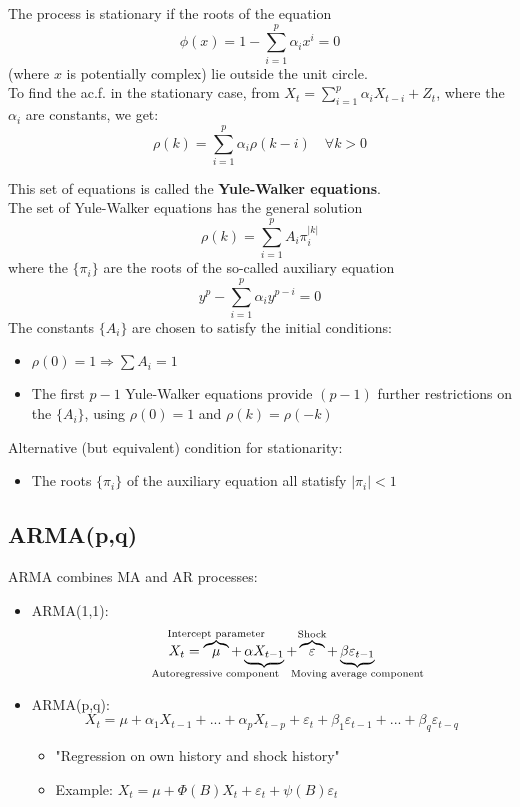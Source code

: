 The process is stationary if the roots of the equation \[
\phi(x)=1-\sum_{i=1}^p \alpha_i x^{i} = 0
\] (where $x$ is potentially complex) lie outside the unit circle.\\

To find the ac.f. in the stationary case, from $X_t=\sum_{i=1}^p \alpha_i X_{t-i}+Z_t$, where the $\alpha_i$ are constants, we get:\[\rho(k)=\sum_{i=1}^p \alpha_i\rho(k-i) \quad \forall k>0\]

This set of equations is called the \textbf{Yule-Walker equations}.\\

The set of Yule-Walker equations has the general solution \[
\rho(k) = \sum_{i=1}^p A_i\pi_i^{|k|}
\]
where the $\{\pi_i\}$ are the roots of the so-called auxiliary equation \[
y^p - \sum_{i=1}^p \alpha_i y^{p-i}=0
\]
The constants $\{A_i\}$ are chosen to satisfy the initial conditions:
\begin{itemize}
    \item $\rho(0)=1 \Rightarrow \sum A_i = 1 $
    \item The first ${p-1}$ Yule-Walker equations provide $(p-1)$ further restrictions on the $\{A_i\}$, using $\rho(0)=1$ and $\rho(k)=\rho(-k)$
\end{itemize}
Alternative (but equivalent) condition for stationarity:
\begin{itemize}
    \item The roots $\{\pi_i\}$ of the auxiliary equation all statisfy $|\pi_i|<1$
\end{itemize}


\subsection{ARMA(p,q)}

ARMA combines MA and AR processes:

\begin{itemize}
    \item ARMA(1,1): \[
    X_t = \overbrace{\mu}^{\mathclap{\text{Intercept parameter}}} + 
    \underbrace{\alpha X_{t-1}}_{\mathclap{\text{Autoregressive component}\phantom{ \quad \quad \quad \quad\quad \quad \quad}}} + 
    \overbrace{\varepsilon}^{\mathclap{\text{Shock}}} + 
    \underbrace{\beta \varepsilon_{t-1}}_{\mathclap{\text{Moving average component}}}
    \]
    \item ARMA(p,q): \[
    X_t=\mu+\alpha_1 X_{t-1} +...+\alpha_p X_{t-p}+ \varepsilon_t + \beta_1 \varepsilon_{t-1}+...+ \beta_q \varepsilon_{t-q}
    \]
    \begin{itemize}
        \item "Regression on own history and shock history"
        \item Example: \(X_t=\mu+\Phi(B)X_t+\varepsilon_t+\psi(B)\varepsilon_t \)
    \end{itemize}
\end{itemize}

